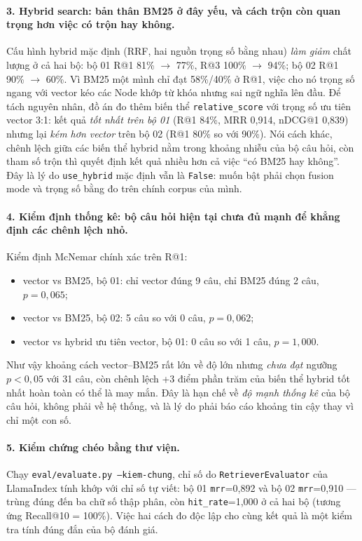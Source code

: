 \paragraph{3. Hybrid search: bản thân BM25 ở đây yếu, và cách trộn còn quan trọng hơn việc có trộn hay không.}
Cấu hình hybrid mặc định (RRF, hai nguồn trọng số bằng nhau) \emph{làm giảm} chất lượng ở cả hai bộ:
bộ 01 R@1 81\% $\to$ 77\%, R@3 100\% $\to$ 94\%; bộ 02 R@1 90\% $\to$ 60\%. Vì BM25 một mình chỉ đạt
58\%/40\% ở R@1, việc cho nó trọng số ngang với vector kéo các Node khớp từ khóa nhưng sai ngữ nghĩa
lên đầu. Để tách nguyên nhân, đồ án đo thêm biến thể \texttt{relative\_score} với trọng số ưu tiên
vector 3:1: kết quả \emph{tốt nhất trên bộ 01} (R@1 84\%, MRR 0,914, nDCG@1 0,839) nhưng lại
\emph{kém hơn vector} trên bộ 02 (R@1 80\% so với 90\%). Nói cách khác, chênh lệch giữa các biến thể
hybrid nằm trong khoảng nhiễu của bộ câu hỏi, còn tham số trộn thì quyết định kết quả nhiều hơn cả
việc ``có BM25 hay không''. Đây là lý do \texttt{use\_hybrid} mặc định vẫn là \texttt{False}: muốn
bật phải chọn fusion mode và trọng số bằng đo trên chính corpus của mình.

\paragraph{4. Kiểm định thống kê: bộ câu hỏi hiện tại chưa đủ mạnh để khẳng định các chênh lệch nhỏ.}
Kiểm định McNemar chính xác trên R@1:
\begin{itemize}
  \item vector vs BM25, bộ 01: chỉ vector đúng 9 câu, chỉ BM25 đúng 2 câu, $p = 0{,}065$;
  \item vector vs BM25, bộ 02: 5 câu so với 0 câu, $p = 0{,}062$;
  \item vector vs hybrid ưu tiên vector, bộ 01: 0 câu so với 1 câu, $p = 1{,}000$.
\end{itemize}
Như vậy khoảng cách vector--BM25 rất lớn về độ lớn nhưng \emph{chưa đạt} ngưỡng $p<0{,}05$ với 31
câu, còn chênh lệch +3 điểm phần trăm của biến thể hybrid tốt nhất hoàn toàn có thể là may mắn. Đây
là hạn chế về \emph{độ mạnh thống kê} của bộ câu hỏi, không phải về hệ thống, và là lý do phải báo
cáo khoảng tin cậy thay vì chỉ một con số.

\paragraph{5. Kiểm chứng chéo bằng thư viện.} Chạy \texttt{eval/evaluate.py --kiem-chung}, chỉ số do
\texttt{RetrieverEvaluator} của LlamaIndex tính khớp với chỉ số tự viết: bộ 01 \texttt{mrr}=0,892 và
bộ 02 \texttt{mrr}=0,910 --- trùng đúng đến ba chữ số thập phân, còn \texttt{hit\_rate}=1,000 ở cả
hai bộ (tương ứng Recall@10 = 100\%). Việc hai cách đo độc lập cho cùng kết quả là một kiểm tra tính
đúng đắn của bộ đánh giá.


